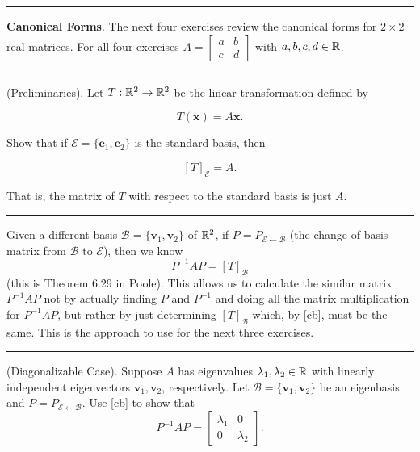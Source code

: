 \documentclass[11pt,letterpaper,boxed]{pset}
\begin{document}
    \hrule
    \bigskip
        \noindent \textbf{Canonical Forms}. The next four exercises review the canonical forms for $2 \times 2$ real matrices. For all four exercises 
        $A = \begin{bmatrix} a & b \\ c & d \end{bmatrix} $ 
        with $a,b,c,d \in \mathbb{R}$. 
    \bigskip
    \hrule
    
    \begin{problem} [Exercise 4.] 
        (Preliminaries). Let $T:\mathbb{R}^2 \to \mathbb{R}^2$ be the linear transformation defined by 
        
        \[ T(\mathbf{x}) = A \mathbf{x}.\]
        
        Show that if  $\mathcal{E} = \{\mathbf{e}_1, \mathbf{e}_2\}$ is the standard basis, then 
        
        \[ [T]_{\mathcal{E}} = A. \]
        
        That is, the matrix of $T$ with respect to the standard basis is just $A$.
    \end{problem}
    \newpage
    
    \hrule
    \bigskip
        \noindent Given a different basis $\mathcal{B} = \{ \mathbf{v}_1, \mathbf{v}_2 \}$ of $\mathbb{R}^2$,  if $P = P_{\mathcal{E} \leftarrow \mathcal{B}}$ (the change of basis matrix from $\mathcal{B}$ to $\mathcal{E}$), then we know
        \begin{equation}
           P^{-1} A  P  = [T]_{\mathcal{B}}
         \label{cb}
        \end{equation}
        (this is Theorem 6.29 in Poole).  This allows us to calculate the similar matrix $P^{-1} A P$ not by actually finding $P$ and $P^{-1}$ and doing all the matrix multiplication for $P^{-1} A P$, but rather by just determining
        $[T]_{\mathcal{B}}$ which, by \eqref{cb}, must be the same. This is the approach to use for the next three exercises. 
    \bigskip
    \hrule 
    
    \begin{problem} [Exercise 5.]
        (Diagonalizable Case). Suppose $A$ has eigenvalues $\lambda_1, \lambda_2 \in \mathbb{R}$ with linearly independent eigenvectors $\mathbf{v}_1, \mathbf{v}_2$, respectively. Let $\mathcal{B} = \{ \mathbf{v}_1, \mathbf{v}_2 \}$ be an eigenbasis and
        $P = P_{\mathcal{E} \leftarrow \mathcal{B}}$. Use \eqref{cb} to show that
        \[  P^{-1} A P =  \begin{bmatrix} \lambda_1 &  0 \\ 0 & \lambda_2 \end{bmatrix}.  \]
    \end{problem}
    \newpage
    
\end{document}
